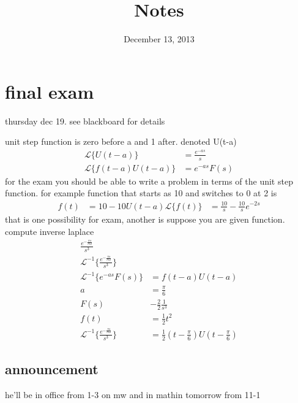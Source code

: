 \documentclass{article}
\begin{document}
\title{Notes}
\date{December 13, 2013}
\maketitle
\section*{final exam}
thursday dec 19. see blackboard for details

unit step function is zero before a and 1 after. denoted U(t-a)
\begin{align*}
  \mathcal{L}\{U(t-a)\}&=\frac{e^{-as}}{s}\\
  \mathcal{L}\{f(t-a)U(t-a)\}&=e^{-as}F(s)
\end{align*}
for the exam you should be able to write a problem in terms of the unit step function. for example function that starts as 10 and switches to 0 at 2 is
\begin{align*}
  f(t)&=10-10U(t-a)
  \mathcal{L}\{f(t)\}&=\frac{10}{s}-\frac{10}{s}e^{-2s}
\end{align*}
that is one possibility for exam, another is suppose you are given function. compute inverse laplace
\begin{align*}
  \frac{e^{-\frac{\pi s}{r6s}}}{s^3}\\
  \mathcal{L}^{-1}\{\frac{e^{-\frac{\pi s}{r6s}}}{s^3}\}\\
  \mathcal{L}^{-1}\{e^{-as}F(s)\}&=f(t-a)U(t-a)\\
  a&=\frac{\pi}{6}\\
  F(s)&-\frac{2}{2}\frac{1}{s^3}\\
  f(t)&=\frac{1}{2}t^2\\
  \mathcal{L}^{-1}\{\frac{e^{-\frac{\pi s}{r6s}}}{s^3}\}&=\frac{1}{2}(t-\frac{\pi}{6})U(t-\frac{\pi}{6})
\end{align*}
\subsection*{announcement}
he'll be in office from 1-3 on mw and in mathin tomorrow from 11-1
\end{document}
